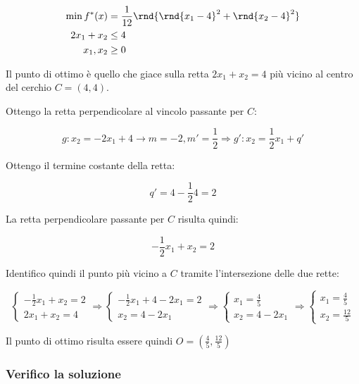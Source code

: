 \documentclass[\main/main.tex]{subfiles}
\begin{document}
\begin{align*}
  \min f^*(x) & = \frac{1}{12}\rnd{\rnd{x_1-4}^2 + \rnd{x_2-4}^2} \\
  2x_1 + x_2  & \leq 4                                            \\
  x_1, x_2    & \geq 0
\end{align*}

Il punto di ottimo è quello che giace sulla retta $2x_1+x_2=4$ più vicino al centro del cerchio $C = (4,4)$.

Ottengo la retta perpendicolare al vincolo passante per $C$:

\[
  g: x_2 = -2x_1 +4 \rightarrow m = -2, m' = \frac{1}{2} \Rightarrow  g': x_2 = \frac{1}{2}x_1 + q'
\]

Ottengo il termine costante della retta:

\[
  q' = 4 - \frac{1}{2}4 = 2
\]

La retta perpendicolare passante per $C$ risulta quindi:

\[
  -\frac{1}{2}x_1 + x_2 = 2
\]

Identifico quindi il punto più vicino a $C$ tramite l'intersezione delle due rette:

\[
  \begin{cases}
    -\frac{1}{2}x_1 + x_2 = 2 \\
    2x_1 + x_2  = 4
  \end{cases}
  \Rightarrow
  \begin{cases}
    -\frac{1}{2}x_1 + 4 - 2x_1 = 2 \\
    x_2  = 4 - 2x_1
  \end{cases}
  \Rightarrow
  \begin{cases}
    x_1 = \frac{4}{5} \\
    x_2  = 4 - 2x_1
  \end{cases}
  \Rightarrow
  \begin{cases}
    x_1 = \frac{4}{5} \\
    x_2  = \frac{12}{5}
  \end{cases}
\]

Il punto di ottimo risulta essere quindi $O = (\frac{4}{5}, \frac{12}{5})$

\subsubsection*{Verifico la soluzione}
\end{document}
